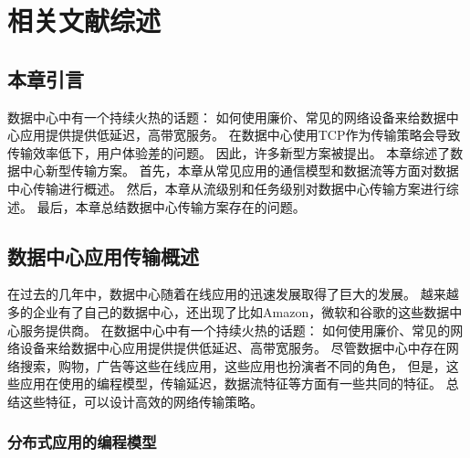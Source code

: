\chapter{相关文献综述}
\label{chapter:background}

\section{本章引言}
数据中心中有一个持续火热的话题：
如何使用廉价、常见的网络设备来给数据中心应用提供提供低延迟，高带宽服务。
在数据中心使用TCP作为传输策略会导致传输效率低下，用户体验差的问题。
因此，许多新型方案被提出。
本章综述了数据中心新型传输方案。
首先，本章从常见应用的通信模型和数据流等方面对数据中心传输进行概述。
然后，本章从流级别和任务级别对数据中心传输方案进行综述。
最后，本章总结数据中心传输方案存在的问题。


\section{数据中心应用传输概述}
在过去的几年中，数据中心随着在线应用的迅速发展取得了巨大的发展。
越来越多的企业有了自己的数据中心，还出现了比如Amazon，微软和谷歌的这些数据中心服务提供商。
在数据中心中有一个持续火热的话题：
如何使用廉价、常见的网络设备来给数据中心应用提供提供低延迟、高带宽服务。
尽管数据中心中存在网络搜索，购物，广告等这些在线应用，这些应用也扮演者不同的角色，
但是，这些应用在使用的编程模型，传输延迟，数据流特征等方面有一些共同的特征。
总结这些特征，可以设计高效的网络传输策略。

\subsection{分布式应用的编程模型}

